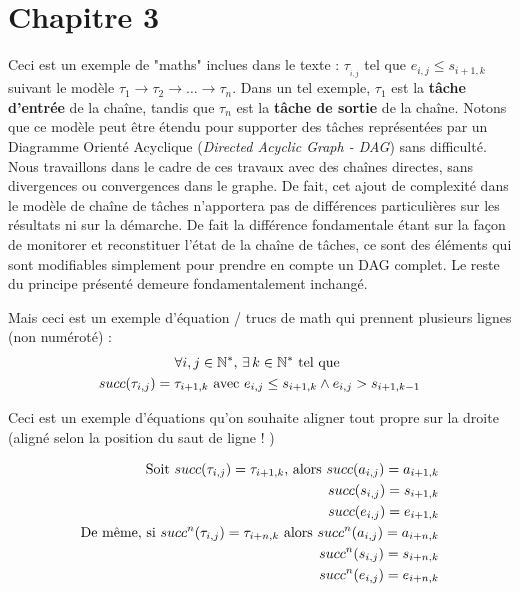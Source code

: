 \documentclass[french, a4paper, 11pt, twoside, pdftex]{StyleThese}
\begin{document}
\setcounter{chapter}{3} %
\dominitoc
\faketableofcontents
\fi

\chapter{Chapitre 3} \label{chap:3_PrincipeArchi}
\minitoc



		Ceci est un exemple de "maths" inclues dans le texte :  $\tau__{i,j}$ tel que $ e_{i,j} \leq s_{i+1, k}$  suivant le modèle $\tau_{1} \rightarrow \tau_2 \rightarrow \ldots \rightarrow \tau_n$. Dans un tel exemple, $\tau_1$ est la \textbf{tâche d'entrée} de la chaîne, tandis que $\tau_n$ est la \textbf{tâche de sortie} de la chaîne. Notons que ce modèle peut être étendu pour supporter des tâches représentées par un Diagramme Orienté Acyclique (\textit{Directed Acyclic Graph - DAG}) sans difficulté. Nous travaillons dans le cadre de ces travaux avec des chaînes directes, sans divergences ou convergences dans le graphe. De fait, cet ajout de complexité dans le modèle de chaîne de tâches n'apportera pas de différences particulières sur les résultats ni sur la démarche. De fait la différence fondamentale étant sur la façon de monitorer et reconstituer l'état de la chaîne de tâches, ce sont des éléments qui sont modifiables simplement pour prendre en compte un DAG complet. Le reste du principe présenté demeure fondamentalement inchangé.

	   Mais ceci est un exemple d'équation / trucs de math qui prennent plusieurs lignes (non numéroté) :
		\begin{multline*}
		\forall i,j \in \mathbb{N}^*, \, \exists \, k \in  \mathbb{N}^*  \textrm{ tel que }  \\
		 succ(\tau_{i,j}) = \tau_{i+1,k} \textup{ avec } e_{i,j} \leq s_{i+1,k} \wedge e_{i,j} > s_{i+1,k-1}
		\end{multline*}

        Ceci est un exemple d'équations qu'on souhaite aligner tout propre sur la droite (aligné selon la position du saut de ligne ! )

		\begin{align*}
		\textup{Soit } succ(\tau_{i,j}) = \tau_{i+1,k} \textup{, alors }
			succ(a_{i,j}) = a_{i+1,k} 	\\
			succ(s_{i,j}) = s_{i+1,k}	\\
			succ(e_{i,j}) = e_{i+1,k}	\\
		\textup{De même, si } succ^n(\tau_{i,j}) = \tau_{i+n,k} \textup{ alors }
			succ^n(a_{i,j}) = a_{i+n,k}		\\
			succ^n(s_{i,j}) = s_{i+n,k}		\\
			succ^n(e_{i,j}) = e_{i+n,k}
		\end{align*}
\end{document}

